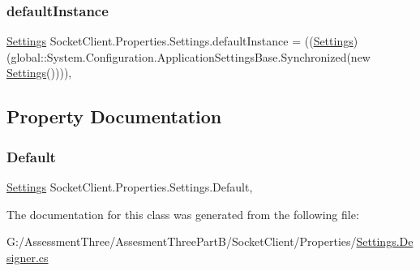 \subsubsection{\texorpdfstring{default\+Instance}{defaultInstance}}
{\footnotesize\ttfamily \hyperlink{class_socket_client_1_1_properties_1_1_settings}{Settings} Socket\+Client.\+Properties.\+Settings.\+default\+Instance = ((\hyperlink{class_socket_client_1_1_properties_1_1_settings}{Settings})(global\+::\+System.\+Configuration.\+Application\+Settings\+Base.\+Synchronized(new \hyperlink{class_socket_client_1_1_properties_1_1_settings}{Settings}())))\hspace{0.3cm}{\ttfamily [static]}, {\ttfamily [private]}}



\subsection{Property Documentation}
\mbox{\label{class_socket_client_1_1_properties_1_1_settings_a052759b480879768820530ea7d850247}} 
\subsubsection{\texorpdfstring{Default}{Default}}
{\footnotesize\ttfamily \hyperlink{class_socket_client_1_1_properties_1_1_settings}{Settings} Socket\+Client.\+Properties.\+Settings.\+Default\hspace{0.3cm}{\ttfamily [static]}, {\ttfamily [get]}}



The documentation for this class was generated from the following file\+:\begin{DoxyCompactItemize}
\item 
G\+:/\+Assessment\+Three/\+Assesment\+Three\+Part\+B/\+Socket\+Client/\+Properties/\hyperlink{_socket_client_2_properties_2_settings_8_designer_8cs}{Settings.\+Designer.\+cs}\end{DoxyCompactItemize}
